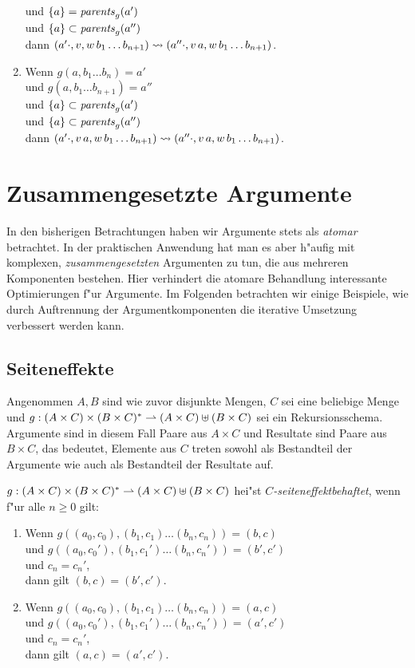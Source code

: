 \documentclass[12pt,a4paper]{article}
\begin{document}
\begin{enumerate}
  und $\{a\} = \mathit{parents}_g(a')$ \\
  und $\{a\} \subset \mathit{parents}_g(a'')$ \\
  dann $(a' \cdot,v,w\,b_1 \ldots b_{n+1}) \rightsquigarrow (a'' \cdot,v\,a,w\,b_1 \ldots b_{n+1})$.
\item Wenn $g(a,b_1 \ldots b_n) = a'$ \\
  und $g(a,b_1 \ldots b_{n+1}) = a''$ \\
  und $\{a\} \subset \mathit{parents}_g(a')$ \\
  und $\{a\} \subset \mathit{parents}_g(a'')$ \\
  dann $(a' \cdot,v\,a,w\,b_1 \ldots b_{n+1}) \rightsquigarrow (a'' \cdot,v\,a,w\,b_1 \ldots b_{n+1})$.
\end{enumerate}


\section{Zusammengesetzte Argumente}

In den bisherigen Betrachtungen haben wir Argumente stets als \emph{atomar} betrachtet. In der praktischen
Anwendung hat man es aber h"aufig mit komplexen, \emph{zusammengesetzten} Argumenten zu tun, die aus mehreren
Komponenten bestehen. Hier verhindert die atomare Behandlung interessante Optimierungen f"ur Argumente. Im
Folgenden betrachten wir einige Beispiele, wie durch Auftrennung der Argumentkomponenten die iterative
Umsetzung verbessert werden kann.


\subsection{Seiteneffekte}

Angenommen $A,B$ sind wie zuvor disjunkte Mengen, $C$ sei eine beliebige Menge und
$g: (A \times C) \times (B \times C)^* \rightharpoonup (A \times C) \uplus (B \times C)$ sei ein
Rekursionsschema. Argumente sind in diesem Fall Paare aus $A \times C$ und Resultate sind
Paare aus $B \times C$, das bedeutet, Elemente aus $C$ treten sowohl als Bestandteil der
Argumente wie auch als Bestandteil der Resultate auf.

\begin{definition}
  $g: (A \times C) \times (B \times C)^* \rightharpoonup (A \times C) \uplus (B \times C)$ hei"st
  \emph{$C$-seiteneffektbehaftet}, wenn f"ur alle $n \ge 0$ gilt:
  \begin{enumerate}
  \item Wenn $g((a_0,c_0),(b_1,c_1) \ldots (b_n,c_n)) = (b,c)$ \\
    und $g((a_0,c_0'),(b_1,c_1') \ldots (b_n,c_n')) = (b',c')$ \\
    und $c_n = c_n'$, \\
    dann gilt $(b,c) = (b',c')$.
  \item Wenn $g((a_0,c_0),(b_1,c_1) \ldots (b_n,c_n)) = (a,c)$ \\
    und $g((a_0,c_0'),(b_1,c_1') \ldots (b_n,c_n')) = (a',c')$ \\
    und $c_n = c_n'$, \\
    dann gilt $(a,c) = (a',c')$.
  \end{enumerate}
\end{definition}
\end{document}
